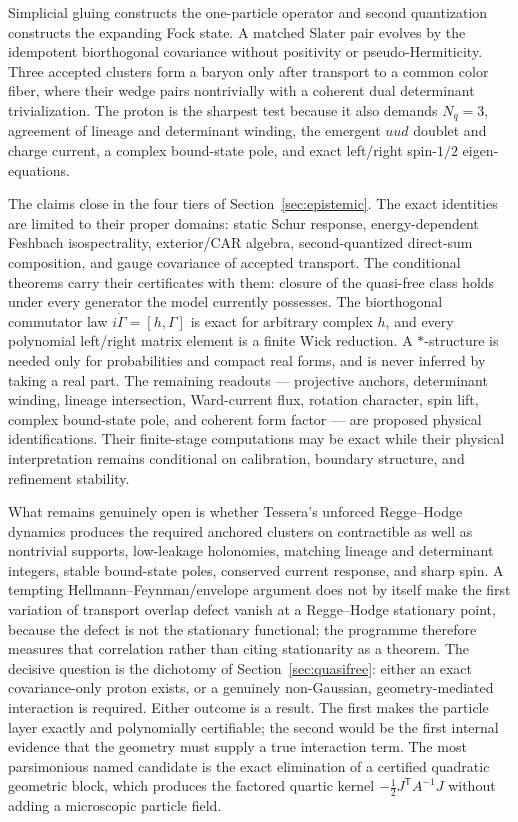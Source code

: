 \documentclass[11pt,letterpaper]{article}
\begin{document}
Simplicial gluing constructs the one-particle operator and second quantization
constructs the expanding Fock state. A matched Slater pair evolves by the
idempotent biorthogonal covariance without positivity or pseudo-Hermiticity.
Three accepted clusters form a baryon only after transport to a common color
fiber, where their wedge pairs nontrivially with a coherent dual determinant
trivialization. The proton is the sharpest test because it also demands
$N_q=3$, agreement of lineage and determinant winding, the emergent $uud$
doublet and charge current, a complex bound-state pole, and exact left/right
spin-$1/2$ eigen-equations.

The claims close in the four tiers of Section~\ref{sec:epistemic}. The exact
identities are limited to their proper domains: static Schur response,
energy-dependent Feshbach isospectrality, exterior/CAR algebra,
second-quantized direct-sum composition, and gauge covariance of accepted
transport. The conditional theorems carry their certificates with them:
closure of the quasi-free class holds under every generator the model
currently possesses. The biorthogonal commutator law
$i\dot\Gamma=[h,\Gamma]$ is exact for arbitrary complex $h$, and every
polynomial left/right matrix element is a finite Wick reduction. A
$*$-structure is needed only for probabilities and compact real forms, and is
never inferred by taking a real part. The remaining readouts --- projective
anchors, determinant winding, lineage intersection, Ward-current flux,
rotation character, spin lift, complex bound-state pole, and coherent form
factor --- are proposed physical identifications. Their finite-stage
computations may be exact while their physical interpretation remains
conditional on calibration, boundary structure, and refinement stability.

What remains genuinely open is whether Tessera's unforced Regge--Hodge dynamics
produces the required anchored clusters on contractible as well as nontrivial
supports, low-leakage holonomies, matching lineage and determinant integers,
stable bound-state poles, conserved current response, and sharp spin. A
tempting
Hellmann--Feynman/envelope argument does not by itself make the first variation
of transport overlap defect vanish at a Regge--Hodge stationary point, because
the defect is not the stationary functional; the programme therefore measures
that correlation rather than citing stationarity as a theorem. The decisive
question is the dichotomy of
Section~\ref{sec:quasifree}: either an exact covariance-only proton exists, or
a genuinely non-Gaussian, geometry-mediated interaction is required. Either
outcome is a result. The first makes the particle layer exactly and
polynomially certifiable; the second would be the first internal evidence that
the geometry must supply a true interaction term. The most parsimonious named
candidate is the exact elimination of a certified quadratic geometric block,
which produces the factored quartic kernel
$-\tfrac12J^{\mathsf T}A^{-1}J$ without adding a microscopic particle field.
\end{document}
